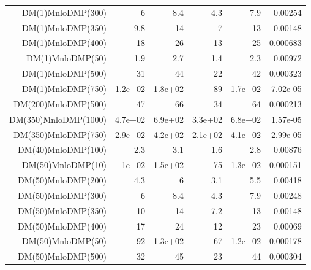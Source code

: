 \begin{table}[hbtp]
\begin{center}
{\begin{tabular}{rrrrrr}
DM(1)MnloDMP(300)         & 6            & 8.4          & 4.3          & 7.9          & 0.00254         \\
DM(1)MnloDMP(350)         & 9.8          & 14           & 7            & 13           & 0.00148         \\
DM(1)MnloDMP(400)         & 18           & 26           & 13           & 25           & 0.000683        \\
DM(1)MnloDMP(50)          & 1.9          & 2.7          & 1.4          & 2.3          & 0.00972         \\
DM(1)MnloDMP(500)         & 31           & 44           & 22           & 42           & 0.000323        \\
DM(1)MnloDMP(750)         & 1.2e+02      & 1.8e+02      & 89           & 1.7e+02      & 7.02e-05        \\
DM(200)MnloDMP(500)       & 47           & 66           & 34           & 64           & 0.000213        \\
DM(350)MnloDMP(1000)      & 4.7e+02      & 6.9e+02      & 3.3e+02      & 6.8e+02      & 1.57e-05        \\
DM(350)MnloDMP(750)       & 2.9e+02      & 4.2e+02      & 2.1e+02      & 4.1e+02      & 2.99e-05        \\
DM(40)MnloDMP(100)        & 2.3          & 3.1          & 1.6          & 2.8          & 0.00876         \\
DM(50)MnloDMP(10)         & 1e+02        & 1.5e+02      & 75           & 1.3e+02      & 0.000151        \\
DM(50)MnloDMP(200)        & 4.3          & 6            & 3.1          & 5.5          & 0.00418         \\
DM(50)MnloDMP(300)        & 6            & 8.4          & 4.3          & 7.9          & 0.00248         \\
DM(50)MnloDMP(350)        & 10           & 14           & 7.2          & 13           & 0.00148         \\
DM(50)MnloDMP(400)        & 17           & 24           & 12           & 23           & 0.00069         \\
DM(50)MnloDMP(50)         & 92           & 1.3e+02      & 67           & 1.2e+02      & 0.000178        \\
DM(50)MnloDMP(500)        & 32           & 45           & 23           & 44           & 0.000304        \\
\hline 
  \end{tabular}
}
  \end{center}
\end{table}

